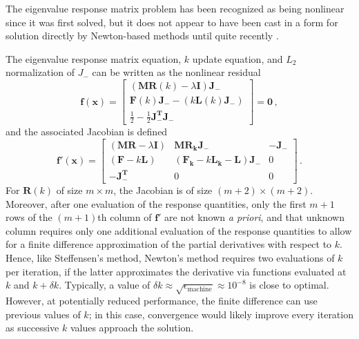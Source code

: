 The eigenvalue response matrix problem has been recognized as being
nonlinear since it was first solved, but it does not 
appear to have been cast in a form for solution directly by 
Newton-based methods until quite recently \cite{roberts2010ncm}.  

The eigenvalue response matrix equation, $k$ update equation, 
and $L_2$ normalization of $J_{-}$ can be written as the nonlinear 
residual
    \begin{equation}
    \mathbf{f(x)} = \left [\begin{array}{c}
            (\mathbf{M}\mathbf{R}(k)-\lambda \mathbf{I}) \mathbf{J_-} \\
            \mathbf{F}(k)\mathbf{J_-} - (k\mathbf{L}(k)\mathbf{J_-} ) \\
            \frac{1}{2}-\frac{1}{2} \mathbf{J^T_-} \mathbf{J_-}   
          \end{array} 
    \right ]  = \mathbf{0} \, ,
    \label{eq:residual}
    \end{equation}
and the associated  Jacobian is defined
  \begin{equation}
  \mathbf{f'(x)} = \left [\begin{array}{ccc}
          (\mathbf{M}\mathbf{R}-\lambda \mathbf{I})  
          &  \mathbf{M}\mathbf{R_k}\mathbf{J_-}                     
          & \mathbf{-J_-}  \\
          (\mathbf{F}-k\mathbf{L})                   
          &  (\mathbf{F_k}-k\mathbf{L_k}-\mathbf{L}) \mathbf{J_-}   
          & 0  \\
          \mathbf{-J^T_-}                             
          & 0                                                       
          & 0
        \end{array} 
  \right ]  \, .
  \label{eq:jacobian}
  \end{equation}
For $\mathbf{R}(k)$ of size $m\times m$, the Jacobian is of 
size $(m+2)\times(m+2)$.  Moreover, after one evaluation of 
the response quantities, only the first $m+1$ rows of the $(m+1)$th 
column of $\mathbf{f'}$ are not known {\it a priori}, and that 
unknown column requires only one additional evaluation of the 
response quantities to allow for a finite difference 
approximation of the partial derivatives with respect to $k$.
Hence, like Steffensen's method, Newton's method requires two 
evaluations of $k$ per iteration, if the latter approximates the 
derivative via functions evaluated at $k$ and $k + \delta k$.  
Typically, a value of 
$\delta k \approx \sqrt{\epsilon_{\text{machine}}} \approx 10^{-8}$
is close to optimal.  However, at potentially reduced performance, the 
finite difference can use previous values of $k$;  in this 
case, convergence would likely improve every iteration as successive $k$ 
values approach the solution.  

